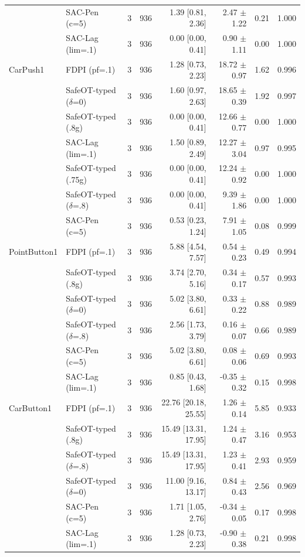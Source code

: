\begin{tabular}{llrrrrrr}
 & SAC-Pen (c=5) & 3 & 936 & 1.39 [0.81, 2.36] & 2.47 $\pm$ 1.22 & 0.21 & 1.000 \\
 & SAC-Lag (lim=.1) & 3 & 936 & 0.00 [0.00, 0.41] & 0.90 $\pm$ 1.11 & 0.00 & 1.000 \\
\midrule
CarPush1 & FDPI (pf=.1) & 3 & 936 & 1.28 [0.73, 2.23] & 18.72 $\pm$ 0.97 & 1.62 & 0.996 \\
 & SafeOT-typed ($\delta$=0) & 3 & 936 & 1.60 [0.97, 2.63] & 18.65 $\pm$ 0.39 & 1.92 & 0.997 \\
 & SafeOT-typed (.8g) & 3 & 936 & 0.00 [0.00, 0.41] & 12.66 $\pm$ 0.77 & 0.00 & 1.000 \\
 & SAC-Lag (lim=.1) & 3 & 936 & 1.50 [0.89, 2.49] & 12.27 $\pm$ 3.04 & 0.97 & 0.995 \\
 & SafeOT-typed (.75g) & 3 & 936 & 0.00 [0.00, 0.41] & 12.24 $\pm$ 0.92 & 0.00 & 1.000 \\
 & SafeOT-typed ($\delta$=.8) & 3 & 936 & 0.00 [0.00, 0.41] & 9.39 $\pm$ 1.86 & 0.00 & 1.000 \\
 & SAC-Pen (c=5) & 3 & 936 & 0.53 [0.23, 1.24] & 7.91 $\pm$ 1.05 & 0.08 & 0.999 \\
\midrule
PointButton1 & FDPI (pf=.1) & 3 & 936 & 5.88 [4.54, 7.57] & 0.54 $\pm$ 0.23 & 0.49 & 0.994 \\
 & SafeOT-typed (.8g) & 3 & 936 & 3.74 [2.70, 5.16] & 0.34 $\pm$ 0.17 & 0.57 & 0.993 \\
 & SafeOT-typed ($\delta$=0) & 3 & 936 & 5.02 [3.80, 6.61] & 0.33 $\pm$ 0.22 & 0.88 & 0.989 \\
 & SafeOT-typed ($\delta$=.8) & 3 & 936 & 2.56 [1.73, 3.79] & 0.16 $\pm$ 0.07 & 0.66 & 0.989 \\
 & SAC-Pen (c=5) & 3 & 936 & 5.02 [3.80, 6.61] & 0.08 $\pm$ 0.06 & 0.69 & 0.993 \\
 & SAC-Lag (lim=.1) & 3 & 936 & 0.85 [0.43, 1.68] & -0.35 $\pm$ 0.32 & 0.15 & 0.998 \\
\midrule
CarButton1 & FDPI (pf=.1) & 3 & 936 & 22.76 [20.18, 25.55] & 1.26 $\pm$ 0.14 & 5.85 & 0.933 \\
 & SafeOT-typed (.8g) & 3 & 936 & 15.49 [13.31, 17.95] & 1.24 $\pm$ 0.47 & 3.16 & 0.953 \\
 & SafeOT-typed ($\delta$=.8) & 3 & 936 & 15.49 [13.31, 17.95] & 1.23 $\pm$ 0.41 & 2.93 & 0.959 \\
 & SafeOT-typed ($\delta$=0) & 3 & 936 & 11.00 [9.16, 13.17] & 0.84 $\pm$ 0.43 & 2.56 & 0.969 \\
 & SAC-Pen (c=5) & 3 & 936 & 1.71 [1.05, 2.76] & -0.34 $\pm$ 0.05 & 0.17 & 0.998 \\
 & SAC-Lag (lim=.1) & 3 & 936 & 1.28 [0.73, 2.23] & -0.90 $\pm$ 0.38 & 0.21 & 0.998 \\
\bottomrule
\end{tabular}
